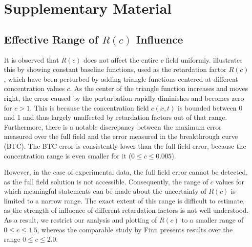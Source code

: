\appendix
\chapter{Supplementary Material}
\section*{Effective Range of $R(c)$ Influence}
\label{app:supplementary}
It is observed that $R(c)$ does not affect the entire $c$ field uniformly.  illustrates this by showing constant baseline functions, used as the retardation factor $R(c)$, which have been perturbed by adding triangle functions centered at different concentration values $c$. As the center of the triangle function increases and moves right, the error caused by the perturbation rapidly diminishes and becomes zero for $c > 1$. This is because the concentration field $c(x,t)$ is bounded between 0 and 1 and thus largely unaffected by retardation factors out of that range.
Furthermore, there is a notable discrepancy between the maximum error measured over the full field and the error measured in the breakthrough curve (BTC). The BTC error is consistently lower than the full field error, because the concentration range is even smaller for it ($0 \leq c \leq 0.005$).

However, in the case of experimental data, the full field error cannot be detected, as the full field solution is not accessible. Consequently, the range of $c$ values for which meaningful statements can be made about the uncertainty of $R(c)$ is limited to a narrow range. The exact extent of this range is difficult to estimate, as the strength of influence of different retardation factors is not well understood.
As a result, we restrict our analysis and plotting of $R(c)$ to a smaller range of $0 \leq c \leq 1.5$, whereas the comparable study by Finn \cite{finn} presents results over the range $0 \leq c \leq 2.0$.


